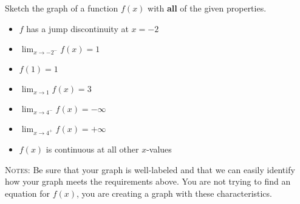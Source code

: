 \documentclass[addpoints,12pt]{exam}
\begin{document}
\begin{questions}
\begin{parts}


\vfill


\end{parts}

\newpage




\question[12] Sketch the graph of a function $f(x)$ with \textbf{all} of the given properties.

\begin{itemize}
\item $f$ has a jump discontinuity at $x= -2$
\item $\displaystyle{\lim_{x\to -2^-} f(x) = 1}$

\item $f(1)=1$
\item $\displaystyle{\lim_{x\to 1} f(x) = 3}$
\item $\displaystyle{\lim_{x\to 4^{-}} f(x) = -\infty}$
\item $\displaystyle{\lim_{x\to 4^{+}} f(x) = +\infty}$
\item $f(x)$ is continuous at all other $x$-values
\end{itemize}




\noindent\textsc{Notes:} Be sure that your graph is well-labeled and that we can easily identify
how your graph meets the requirements above. You are not trying to find an equation for $f(x)$,
you are creating a graph with these characteristics.

\begin{center}

\end{center}



\vfill

\newpage







\end{questions}
\end{document}
